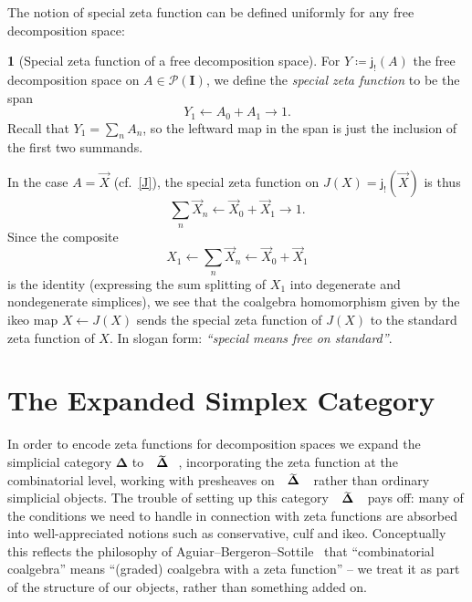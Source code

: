 \documentclass{amsart}
\makeatletter
\newcommand{\inert}{\mathbf{I}}
\newcommand{\simpl}{\mathbf{\Delta}}
\def\overarrow#1{{\vec{#1}}}
\def\nondeg{\overarrow}
\newcommand*\wt[1]{\mathpalette\wthelper{#1}}
\newcommand*\wthelper[2]{%
        \hbox{\dimen@\accentfontxheight#1%
                \accentfontxheight#11.3\dimen@
                $\m@th#1\widetilde{#2}$%
                \accentfontxheight#1\dimen@
        }%
}
\newcommand*\accentfontxheight[1]{%
        \fontdimen5\ifx#1\displaystyle
                \textfont
        \else\ifx#1\textstyle
                \textfont
        \else\ifx#1\scriptstyle
                \scriptfont
        \else
                \scriptscriptfont
        \fi\fi\fi3
}
\newcommand{\Tsimpl}{\wt\simpl}
\newcommand{\lilj}{\mathsf{j}}
\newcommand{\pre}{\mathcal{P}}
\theoremstyle{definition}
\theoremstyle{noname}
\newtheorem{blanko}[theorem]{}
\makeatother
\begin{document}
  The notion of special zeta function can be defined 
  uniformly for any free decomposition space: 

\begin{blanko}[Special zeta function of a free decomposition space]\label{zeta of free}
  For $Y\coloneq \lilj_!(A)$ the free decomposition space on $A\in \pre(\inert)$, we
  define the {\em special zeta function} to be the span
  $$
  Y_1 \leftarrow A_0+A_1 \to 1 .
  $$
  Recall that $Y_1 = \sum_n A_n$, so the leftward map  in the span is just the 
  inclusion of the first two summands. 
  
  In the case $A= \nondeg X$ (cf.\ \ref{J}), 
  the special zeta function on $J(X) = \lilj_!(\nondeg X)$ is thus
  $$
  \sum_n \nondeg X_n \longleftarrow \nondeg X_0+ \nondeg X_1 \longrightarrow 1 .
  $$
  Since the composite 
  $$
  X_1 \leftarrow \sum_n \nondeg X_n \leftarrow \nondeg X_0+ \nondeg X_1
  $$
  is the identity (expressing the sum splitting of $X_1$ into degenerate and
  nondegenerate simplices), we see that the coalgebra homomorphism given by the
  ikeo map $X \leftarrow J(X)$ sends the special zeta function
  of $J(X)$ to the standard zeta function of $X$. 
  In slogan form: {\em ``special means free on standard''}.
\end{blanko}




 

\section{The Expanded Simplex Category}\label{sec shape categories}

In order to encode zeta functions for decomposition spaces we expand the simplicial category $\simpl$ to $\Tsimpl$, incorporating the zeta function at the combinatorial level, working with presheaves on $\Tsimpl$ rather than ordinary simplicial objects.
The trouble of setting up this category $\Tsimpl$ pays off: many of the conditions we need to handle in connection with zeta functions are absorbed into well-appreciated notions such as conservative, culf and ikeo.
Conceptually this reflects the philosophy of Aguiar--Bergeron--Sottile~\cite{Aguiar-Bergeron-Sottile} that ``combinatorial coalgebra'' means ``(graded) coalgebra with a zeta function'' -- we treat it as part of the structure of our objects, rather than something added on.
\end{document}
